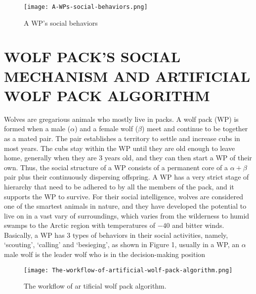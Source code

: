 \documentclass[conference]{IEEEtran}
\begin{document}
\begin{figure}[h]
\centering
\begin{minipage}{0.4\textwidth}
    \texttt{[image: A-WPs-social-behaviors.png]}
    \caption{A WP's social behaviors}
\end{minipage}
\end{figure}

\section{WOLF PACK’S SOCIAL MECHANISM AND ARTIFICIAL
WOLF PACK ALGORITHM}

Wolves are gregarious animals who mostly live in packs.
A wolf pack (WP) is formed when a male ($\alpha$) and a female
wolf ($\beta$) meet and continue to be together as a mated pair.
The pair establishes a territory to settle and increase cubs in
most years. The cubs stay within the WP until they are old
enough to leave home, generally when they are 3 years old,
and they can then start a WP of their own. Thus, the social
structure of a WP consists of a permanent core of a $\alpha + \beta$
pair plus their continuously dispersing offspring. A WP has a
very strict stage of hierarchy that need to be adhered to by all
the members of the pack, and it supports the WP to survive.
For their social intelligence, wolves are considered one of
the smartest animals in nature, and they have developed the
potential to live on in a vast vary of surroundings, which
varies from the wilderness to humid swamps to the Arctic
region with temperatures of $-40$ and bitter winds.
Basically, a WP has 3 types of behaviors in their social
activities, namely, ‘scouting’, ‘calling’ and ‘besieging’,
as shown in Figure 1, usually in a WP, an $\alpha$ male wolf
is the leader wolf who is in the decision-making position

\begin{figure}[H]
\centering
\begin{minipage}{0.4\textwidth}
    \texttt{[image: The-workflow-of-artificial-wolf-pack-algorithm.png]}
    \caption{The workflow of ar tificial wolf pack algorithm.}
\end{minipage}
\end{figure}
\end{document}
